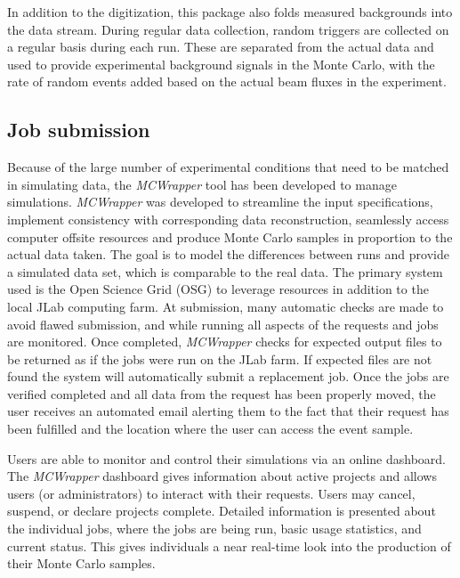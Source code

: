 In addition to the digitization, this package also folds measured backgrounds into the data stream. During regular data collection, random triggers are collected on a regular basis during each run. These are separated from the actual data and used to provide experimental background signals in the Monte Carlo, with the rate of random events added based on the actual beam fluxes in the experiment. 

\subsection{Job submission \label{sec:jobsubmission}}
Because of the large number of experimental conditions that need to be matched in simulating data, the \emph{MCWrapper} tool has been developed to manage simulations. \emph{MCWrapper} was developed to streamline the input specifications, implement consistency with corresponding data reconstruction, seamlessly access computer offsite resources and produce Monte Carlo samples in proportion to the actual data taken. The goal is to model the differences between runs and provide a simulated data set, which is comparable to the real data. The primary system used is the Open Science Grid (OSG) to leverage resources in addition to the local JLab computing farm. At submission, many automatic checks are made to avoid flawed submission, and while running all aspects of the requests and jobs are monitored. Once completed, \emph{MCWrapper} checks for expected output files to be returned as if the jobs were run on the JLab farm. If expected files are not found the system will automatically submit a replacement job. Once the jobs are verified completed and all data from the request has been properly moved, the user receives an automated email alerting them to the fact that their request has been fulfilled and the location where the user can access the event sample.

Users are able to monitor and control their simulations via an online dashboard. The \emph{MCWrapper} dashboard gives information about active projects and allows users (or administrators) to interact with their requests. Users may cancel, suspend, or declare projects complete. Detailed information is presented about the individual jobs, where the jobs are being run, basic usage statistics, and current status.  This gives individuals a near real-time look into the production of their Monte Carlo samples.

